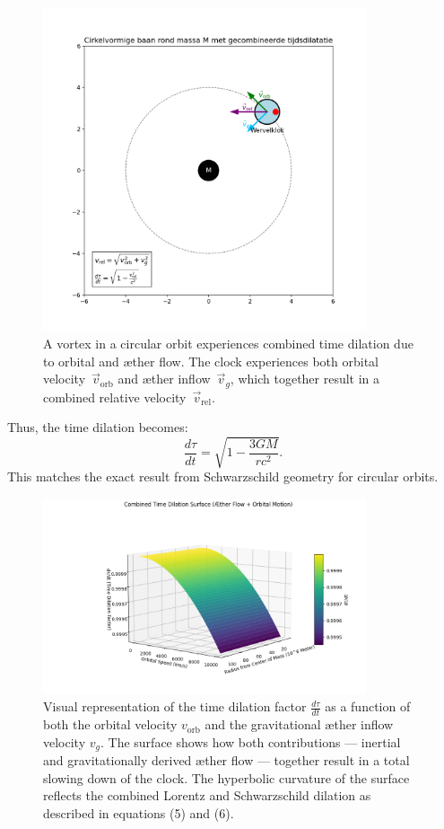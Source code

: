 \begin{figure}[htbp]
    \centering
    \includegraphics[width=0.85\textwidth]{08-BaanRondMassa}
    \caption{A vortex in a circular orbit experiences combined time dilation due to orbital and æther flow. The clock experiences both orbital velocity~$\vec{v}_{\mathrm{orb}}$ and æther inflow~$\vec{v}_g$, which together result in a combined relative velocity~$\vec{v}_{\mathrm{rel}}$.}
    \label{fig:BaanRondMassa}
\end{figure}

Thus, the time dilation becomes:
\[
\frac{d\tau}{dt} = \sqrt{1 - \frac{3GM}{rc^2}}. \tag{6}
\]
This matches the exact result from Schwarzschild geometry for circular orbits.

\begin{figure}[htbp]
    \centering
    \includegraphics[width=0.85\textwidth]{09-en-TimeDialationCombined}
    \caption{Visual representation of the time dilation factor \( \frac{d\tau}{dt} \) as a function of both the orbital velocity \( v_{\text{orb}} \) and the gravitational æther inflow velocity \( v_g \). The surface shows how both contributions — inertial and gravitationally derived æther flow — together result in a total slowing down of the clock. The hyperbolic curvature of the surface reflects the combined Lorentz and Schwarzschild dilation as described in equations (5) and (6).}
    \label{fig:TimeDialationCombined}
\end{figure}

